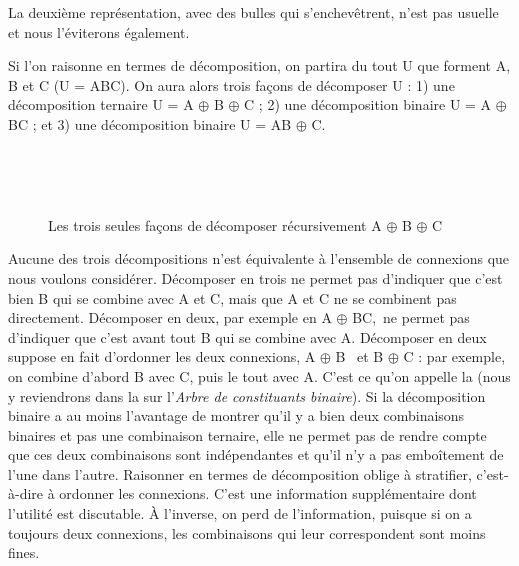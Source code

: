 La deuxième représentation, avec des bulles qui s’enchevêtrent, n’est pas usuelle et nous l’éviterons également.

Si l’on raisonne en termes de décomposition, on partira du tout U que forment A, B et C (U = ABC). On aura alors trois façons de décomposer U : 1) une décomposition ternaire U = A ${\oplus}$ B ${\oplus}$ C ; 2) une décomposition binaire U = A ${\oplus}$ BC ; et 3) une décomposition binaire U = AB ${\oplus}$ C.

\begin{figure}
\\\medskip
{}\\\medskip
{}
\caption{\label{fig:}Les trois seules façons de décomposer récursivement A $\oplus$ B $\oplus$ C}
\end{figure}

Aucune des trois décompositions n’est équivalente à l’ensemble de connexions que nous voulons considérer. Décomposer en trois ne permet pas d’indiquer que c’est bien B qui se combine avec A et C, mais que A et C ne se combinent pas directement. Décomposer en deux, par exemple en A ${\oplus}$ BC,~ne permet pas d’indiquer que c’est avant tout B qui se combine avec A. Décomposer en deux suppose en fait d’ordonner les deux connexions, A ${\oplus}$ B~ et B ${\oplus}$ C : par exemple, on combine d’abord B avec C, puis le tout avec A. C’est ce qu’on appelle la  (nous y reviendrons dans la  sur l’\textit{Arbre de constituants binaire}). Si la décomposition binaire a au moins l’avantage de montrer qu’il y a bien deux combinaisons binaires et pas une combinaison ternaire, elle ne permet pas de rendre compte que ces deux combinaisons sont indépendantes et qu’il n’y a pas emboîtement de l’une dans l’autre. Raisonner en termes de décomposition oblige à stratifier, c’est-à-dire à ordonner les connexions. C’est une information supplémentaire dont l’utilité est discutable. À l’inverse, on perd de l’information, puisque si on a toujours deux connexions, les combinaisons qui leur correspondent sont moins fines.

